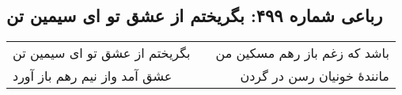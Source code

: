 \begin{center}
\section*{رباعی شماره ۴۹۹: بگریختم از عشق تو ای سیمین تن}
\label{sec:sh499}
\begin{longtable}{l p{0.5cm} r}
بگریختم از عشق تو ای سیمین تن
&&
باشد که زغم باز رهم مسکین من
\\
عشق آمد واز نیم رهم باز آورد
&&
مانندهٔ خونیان رسن در گردن
\\
\end{longtable}
\end{center}
